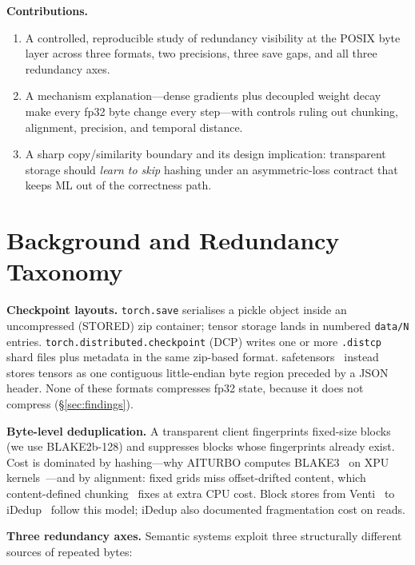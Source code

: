 \documentclass[sigconf,10pt,anonymous,review]{acmart}
\begin{document}
\smallskip
\noindent\textbf{Contributions.}
\begin{enumerate}
  \item A controlled, reproducible study of redundancy visibility at the
  POSIX byte layer across three formats, two precisions, three save gaps,
  and all three redundancy axes.
  \item A mechanism explanation---dense gradients plus decoupled weight
  decay make every fp32 byte change every step---with controls ruling
  out chunking, alignment, precision, and temporal distance.
  \item A sharp copy/similarity boundary and its design implication:
  transparent storage should \emph{learn to skip} hashing under an
  asymmetric-loss contract that keeps ML out of the correctness path.
\end{enumerate}

\section{Background and Redundancy Taxonomy}
\label{sec:background}

\textbf{Checkpoint layouts.} \texttt{torch.save} serialises a pickle
object inside an uncompressed (STORED) zip container; tensor storage
lands in numbered \texttt{data/N} entries.
\texttt{torch.\allowbreak distributed.\allowbreak checkpoint} (DCP)
writes one or more
\texttt{.distcp} shard files plus metadata in the same zip-based format.
safetensors~\cite{safetensors} instead stores tensors as one contiguous
little-endian byte region preceded by a JSON header. None of these formats
compresses fp32 state, because it does not compress
(\S\ref{sec:findings}).

\textbf{Byte-level deduplication.} A transparent client fingerprints
fixed-size blocks (we use BLAKE2b-128) and suppresses blocks whose
fingerprints already exist. Cost is dominated by hashing---why AITURBO
computes BLAKE3~\cite{blake3} on XPU kernels~\cite{aiturbo}---and by
alignment: fixed grids miss offset-drifted content, which
content-defined chunking~\cite{lbfs,fastcdc} fixes at extra CPU cost.
Block stores from Venti~\cite{venti} to iDedup~\cite{idedup} follow this
model; iDedup also documented fragmentation cost on reads.

\textbf{Three redundancy axes.} Semantic systems exploit three
structurally different sources of repeated bytes:
\end{document}
